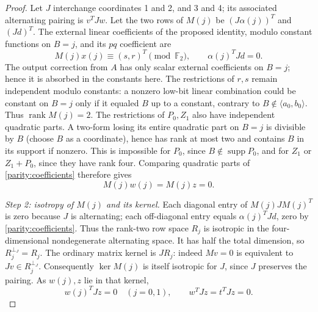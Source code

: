 \documentclass[11pt,a4paper]{article}
\theoremstyle{plain}
\theoremstyle{remark}
\newcommand{\F}{\mathbb F_2}
\newcommand{\supp}{\operatorname{supp}}
\newcommand{\rk}{\operatorname{rank}}
\begin{document}
\begin{proof}
Let $J$ interchange coordinates 1 and 2, and 3 and 4; its associated alternating pairing is $v^TJw$. Let the two rows of $M(j)$ be $(J\alpha(j))^T$ and $(Jd)^T$. The external linear coefficients of the proposed identity, modulo constant functions on $B=j$, and its $pq$ coefficient are
\begin{equation}\label{parity:coefficients}
M(j)x(j)\equiv(s,r)^T\pmod\F,\qquad
\alpha(j)^TJd=0.
\end{equation}
The output correction from $A$ has only scalar external coefficients on $B=j$; hence it is absorbed in the constants here. The restrictions of $r,s$ remain independent modulo constants: a nonzero low-bit linear combination could be constant on $B=j$ only if it equaled $B$ up to a constant, contrary to $B\notin\langle a_0,b_0\rangle$. Thus $\rk M(j)=2$.
The restrictions of $P_0,Z_1$ also have independent quadratic parts. A two-form losing its entire quadratic part on $B=j$ is divisible by $B$ (choose $B$ as a coordinate), hence has rank at most two and contains $B$ in its support if nonzero. This is impossible for $P_0$, since $B\notin\supp P_0$, and for $Z_1$ or $Z_1+P_0$, since they have rank four. Comparing quadratic parts of \eqref{parity:coefficients} therefore gives
\[
M(j)w(j)=M(j)z=0.
\]

\emph{Step 2: isotropy of $M(j)$ and its kernel.}
Each diagonal entry of $M(j)JM(j)^T$ is zero because $J$ is alternating; each off-diagonal entry equals $\alpha(j)^TJd$, zero by \eqref{parity:coefficients}. Thus the rank-two row space $R_j$ is isotropic in the four-dimensional nondegenerate alternating space. It has half the total dimension, so $R_j^{\perp_J}=R_j$. The ordinary matrix kernel is $JR_j$: indeed $Mv=0$ is equivalent to $Jv\in R_j^{\perp_J}$. Consequently $\ker M(j)$ is itself isotropic for $J$, since $J$ preserves the pairing. As $w(j),z$ lie in that kernel,
\[
w(j)^TJz=0\quad(j=0,1),\qquad w^TJz=t^TJz=0.
\]


\end{proof}
\end{document}
